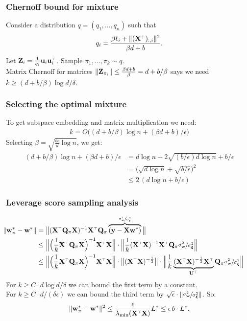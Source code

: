 \documentclass{beamer}
\begin{document}
\begin{frame}
  \frametitle{Chernoff bound for mixture}
  Consider a distribution $q=(q_1,\dots,q_n)$ such that
  \begin{align*}
    q_i = \frac{\beta\ell_i+ \| (\mathbf X^+)_{:,i}\|^2}{\beta d +b}.
  \end{align*}
  Let $\Z_i = \frac1{q_i}\u_i\u_i^\top$.
  Sample $\pi_1,\dots,\pi_k\sim q$.\\[1mm]
  Matrix Chernoff for matrices
  $\|\mathbf Z_{\pi_i}\|\leq \frac{\beta d + b}{\beta}= d + b/\beta$ says we
  need $k\geq (d+b/\beta)\log d/\delta$.
\end{frame}

\begin{frame}
  \frametitle{Selecting the optimal mixture}
  To get subspace embedding and matrix multiplication we need:
  \begin{align*}
    k = O\big( (d+b/\beta)\log n + (\beta d + b)/\epsilon\big)
  \end{align*}
  Selecting $\beta = \sqrt{\frac{b\epsilon}{d}\log n}$, we get:
  \begin{align*}
    (d+b/\beta)\log n + (\beta d + b)/\epsilon
    &= d\log n +
    2\sqrt{(b/\epsilon)d\log n} + b/\epsilon\\
&=\big(\sqrt{d\log n} + \sqrt{b/\epsilon}\big)^2\\
&\leq 2\,(d\log n + b/\epsilon)
    \end{align*}
  \end{frame}

\begin{frame}
  \frametitle{Leverage score sampling analysis}
  \begin{align*}
\hspace{-6mm}    \|\w_\pi^*-\w^*\|
    &= \big\|(\X^\top\Q_\pi\X)^{-1}\X^\top\Q_\pi
      \overbrace{(\y - \X\w^*)}^{\r}\big\|\\
    &\leq
      \Big\|\Big(\frac1k\X^\top\Q_\pi\X\Big)^{-1}\X^\top\X\Big\|\cdot
      \Big\|\frac1k(\X^\top\X)^{-1}\X^\top\Q_\pi \r\Big\|\\
    &\leq
      \Big\|\Big(\frac1k\X^\top\Q_\pi\X\Big)^{-1}\X^\top\X\Big\|\cdot
      \big\|(\X^\top\X)^{-\frac12}\big\|\cdot
      \Big\|\frac1k\underbrace{(\X^\top\X)^{-\frac12}\X^\top}_{\U^\top}\Q_\pi\r\Big\|
  \end{align*}
  For $k\geq C\cdot d\log d/\delta$ we can bound the first term by a
  constant.\\
  For $k\geq C\cdot d/(\delta\epsilon)$ we can bound the third term by
  $\sqrt{\epsilon}\cdot \|\sfrac{\sigma_{\mathbf w}^2}{\sigma_{\boldsymbol\xi}^2}\|$. So:
  \begin{align*}
    \|\w_\pi^*-\w^*\|^2\leq \frac{\epsilon}{\lambda_{\min}(\X^\top\X)}
    L^*\leq \epsilon\,b\cdot L^*.
  \end{align*}

\end{frame}
\end{document}
